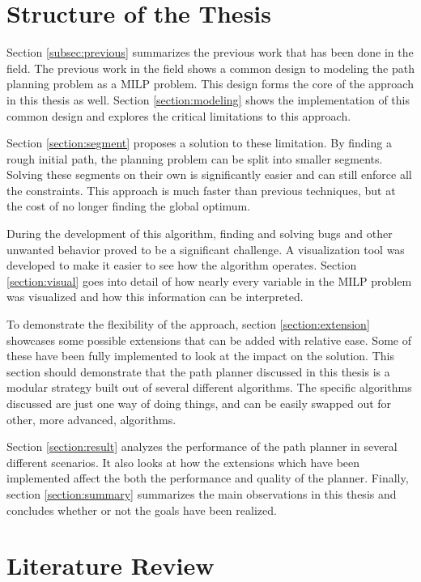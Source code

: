 \section{Structure of the Thesis}
Section \ref{subsec:previous} summarizes the previous work that has been done in the field.
The previous work in the field shows a common design to modeling the path planning problem as a MILP problem. This design forms the core of the approach in this thesis as well. Section \ref{section:modeling} shows the implementation of this common design and explores the critical limitations to this approach.
\par
Section \ref{section:segment} proposes a solution to these limitation. By finding a rough initial path, the planning problem can be split into smaller segments. Solving these segments on their own is significantly easier and can still enforce all the constraints. This approach is much faster than previous techniques, but at the cost of no longer finding the global optimum.
\par
During the development of this algorithm, finding and solving bugs and other unwanted behavior proved to be a significant challenge. A visualization tool was developed to make it easier to see how the algorithm operates. Section \ref{section:visual} goes into detail of how nearly every variable in the MILP problem was visualized and how this information can be interpreted.
\par
To demonstrate the flexibility of the approach, section \ref{section:extension} showcases some possible extensions that can be added with relative ease. Some of these have been fully implemented to look at the impact on the solution. This section should demonstrate that the path planner discussed in this thesis is a modular strategy built out of several different algorithms. The specific algorithms discussed are just one way of doing things, and can be easily swapped out for other, more advanced, algorithms. 
\par
Section \ref{section:result} analyzes the performance of the path planner in several different scenarios. It also looks at how the extensions which have been implemented affect the both the performance and quality of the planner.
Finally, section \ref{section:summary} summarizes the main observations in this thesis and concludes whether or not the goals have been realized.




\section{Literature Review}



